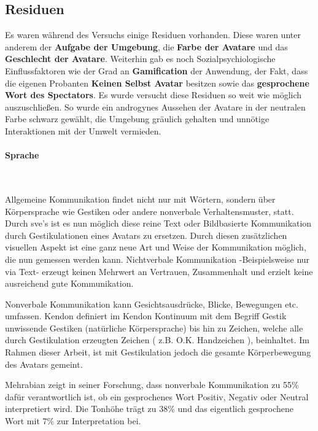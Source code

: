 \documentclass[a4paper,11pt]{article}%
\renewcommand{\\}{\vspace*{0.5\baselineskip} \newline}
\begin{document}
	\subsection{Residuen}
Es waren während des Versuchs einige Residuen vorhanden. Diese waren unter anderem der \textbf{Aufgabe der Umgebung}, die \textbf{Farbe der Avatare} und das \textbf{Geschlecht der Avatare}. Weiterhin gab es noch Sozialpsychiologische Einflussfaktoren wie der Grad an \textbf{Gamification} der Anwendung, der Fakt, dass die eigenen Probanten \textbf{Keinen Selbst Avatar} besitzen sowie das \textbf{gesprochene Wort des Spectators}.
Es wurde versucht diese Residuen so weit wie möglich auszuschließen. So wurde ein androgynes Aussehen der Avatare in der neutralen Farbe schwarz gewählt, die Umgebung gräulich gehalten und unnötige Interaktionen mit der Umwelt vermieden.
		
			
			\paragraph{Sprache} $~$ \\	
			
Allgemeine Kommunikation findet nicht nur mit Wörtern, sondern über Körpersprache wie Gestiken oder andere nonverbale Verhaltensmuster, statt. Durch \ac{sve}'s ist es nun möglich diese reine Text oder Bildbasierte Kommunikation durch Gestikulationen eines Avatars zu ersetzen. Durch diesen zusätzlichen visuellen Aspekt ist eine ganz neue Art und Weise der Kommunikation möglich, die nun gemessen werden kann. 
Nichtverbale Kommunikation -Beispielsweise nur via Text- erzeugt keinen Mehrwert an Vertrauen, Zusammenhalt und erzielt keine ausreichend gute Kommunikation. \citep[p.81]{haslam2003social}			

Nonverbale Kommunikation kann Gesichtsausdrücke, Blicke, Bewegungen etc. umfassen. Kendon definiert im \dq{}Kendon Kontinuum\dq{} mit dem Begriff \dq{}Gestik\dq{} unwissende Gestiken (natürliche Körpersprache) bis hin zu \dq{} Zeichen\flqq, welche alle durch Gestikulation erzeugten Zeichen ( z.B. O.K. Handzeichen ), beinhaltet. \citep[37]{mcneill1992hand} 
Im Rahmen dieser Arbeit, ist mit Gestikulation jedoch die gesamte Körperbewegung des Avatars gemeint.

Mehrabian zeigt in seiner Forschung, dass nonverbale Kommunikation zu 55\% dafür verantwortlich ist, ob ein gesprochenes Wort Positiv, Negativ oder Neutral interpretiert wird. Die Tonhöhe trägt zu 38\% und das eigentlich gesprochene Wort mit 7\% zur Interpretation bei. \citep[43]{mehrabian1971silent}
\end{document}
